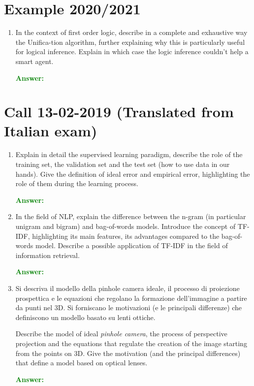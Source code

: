 \documentclass[12pt]{article}
\begin{document}
\section{Example 2020/2021}
\begin{enumerate}[label=\textbf{C.\arabic*}]


    \item In the context of first order logic, describe in a complete and exhaustive way the Unifica-tion algorithm, further explaining why this is particularly useful for logical inference.
    Explain in which case the logic inference couldn't help a smart agent.
    
    \textcolor{green}{\textbf{Answer:}}

\end{enumerate}

\section{Call 13-02-2019 (Translated from Italian exam)}
\begin{enumerate}[label=\textbf{D.\arabic*}]
    \item Explain in detail the supervised learning paradigm, describe the role of the training set, the validation set and the test set (how to use data in our hands).
    Give the definition of ideal error and empirical error, highlighting the role of them during the learning process.

    \textcolor{green}{\textbf{Answer:}}

    \item In the field of NLP, explain the difference between the n-gram (in particular unigram and bigram) and bag-of-words models.
    Introduce the concept of TF-IDF, highlighting its main features, its advantages compared to the bag-of-words model.
    Describe a possible application of TF-IDF in the field of information retrieval.

    \textcolor{green}{\textbf{Answer:}}

    \item Si descriva il modello della pinhole camera ideale, il processo di proiezione prospettica e le equazioni che regolano la formazione dell'immagine a partire da punti nel 3D.
    Si forniscano le motivazioni (e le principali differenze) che definiscono un modello basato su lenti ottiche.

    Describe the model of ideal \textit{pinhole camera}, the process of perspective projection and the equations that regulate the creation of the image starting from the points on 3D.
    Give the motivation (and the principal differences) that define a model based on optical lenses.

    \textcolor{green}{\textbf{Answer:}}



\end{enumerate}
\end{document}
